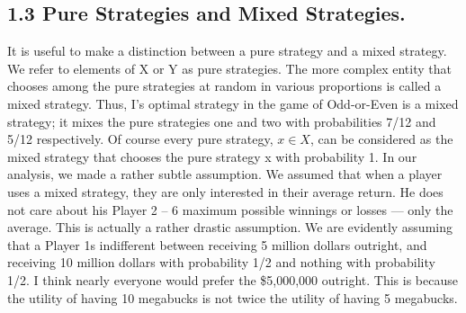 \subsection{1.3 Pure Strategies and Mixed Strategies.} It is useful to make a distinction
between a pure strategy and a mixed strategy. We refer to elements of X or Y as pure
strategies. The more complex entity that chooses among the pure strategies at random in
various proportions is called a mixed strategy. Thus, I’s optimal strategy in the game of
Odd-or-Even is a mixed strategy; it mixes the pure strategies one and two with probabilities
7/12 and 5/12 respectively. Of course every pure strategy, $x \in X$, can be considered as
the mixed strategy that chooses the pure strategy x with probability 1.
In our analysis, we made a rather subtle assumption. We assumed that when a player
uses a mixed strategy, they are only interested in their average return. He does not care about his
Player 2 – 6
maximum possible winnings or losses — only the average. This is actually a rather drastic
assumption. We are evidently assuming that a Player 1s indifferent between receiving 5
million dollars outright, and receiving 10 million dollars with probability 1/2 and nothing
with probability 1/2. I think nearly everyone would prefer the \$5,000,000 outright. This is
because the utility of having 10 megabucks is not twice the utility of having 5 megabucks.

